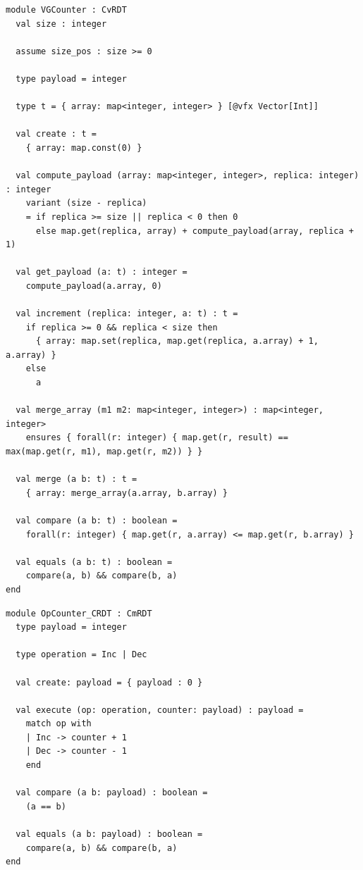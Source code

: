 \begin{lstlisting}[caption={\texttt{VGCounter}}, label={lst:app_vgcounter}]
module VGCounter : CvRDT
  val size : integer

  assume size_pos : size >= 0

  type payload = integer

  type t = { array: map<integer, integer> } [@vfx Vector[Int]]

  val create : t =
    { array: map.const(0) }

  val compute_payload (array: map<integer, integer>, replica: integer) : integer
    variant (size - replica)
    = if replica >= size || replica < 0 then 0
      else map.get(replica, array) + compute_payload(array, replica + 1)

  val get_payload (a: t) : integer =
    compute_payload(a.array, 0)

  val increment (replica: integer, a: t) : t =
    if replica >= 0 && replica < size then
      { array: map.set(replica, map.get(replica, a.array) + 1, a.array) }
    else
      a

  val merge_array (m1 m2: map<integer, integer>) : map<integer, integer>
    ensures { forall(r: integer) { map.get(r, result) == max(map.get(r, m1), map.get(r, m2)) } }

  val merge (a b: t) : t =
    { array: merge_array(a.array, b.array) }

  val compare (a b: t) : boolean =
    forall(r: integer) { map.get(r, a.array) <= map.get(r, b.array) }

  val equals (a b: t) : boolean =
    compare(a, b) && compare(b, a)
end
\end{lstlisting}

\begin{lstlisting}[caption={\texttt{OpCounter\_CRDT}}, label={lst:app_opcounter}]
module OpCounter_CRDT : CmRDT
  type payload = integer

  type operation = Inc | Dec

  val create: payload = { payload : 0 }

  val execute (op: operation, counter: payload) : payload =
    match op with
    | Inc -> counter + 1
    | Dec -> counter - 1
    end

  val compare (a b: payload) : boolean =
    (a == b)

  val equals (a b: payload) : boolean =
    compare(a, b) && compare(b, a)
end
\end{lstlisting}

